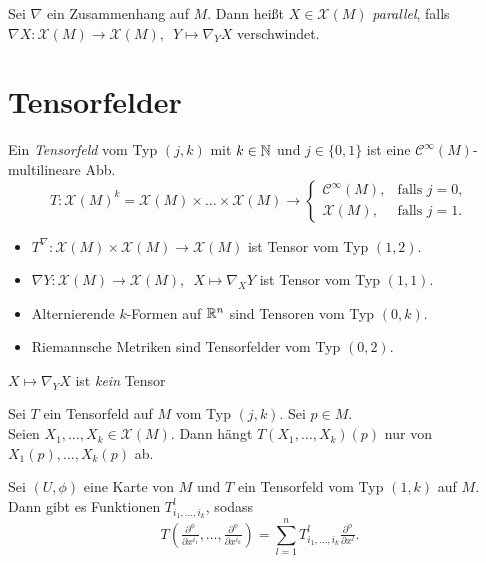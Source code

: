 \documentclass{cheat-sheet}
\newcommand{\coord}[1]{\tfrac{\partial^\phi}{\partial x^{#1}}} %
\newcommand{\Cont}{\mathcal{C}} %
\newcommand{\VF}{\mathcal{X}} %
\begin{document}
\begin{defn}
  Sei $\nabla$ ein Zusammenhang auf $M$. Dann heißt $X \in \VF(M)$ \emph{parallel}, falls
  $\nabla X : \VF(M) \to \VF(M), \enspace Y \mapsto \nabla_Y X$
  verschwindet.
\end{defn}

\section{Tensorfelder}

\begin{defn}
  Ein \emph{Tensorfeld} vom Typ $(j, k)$ mit $k \in \mathbb{N}$ und $j \in \{ 0, 1 \}$ ist eine $\Cont^\infty(M)$-multilineare Abb.
  \vspace{-0.6em}
  \[
    T : \VF(M)^k = \VF(M) \times \ldots \times \VF(M) \to
    \begin{cases}
      \Cont^\infty(M), & \text{falls } j = 0,\\
      \VF(M), & \text{falls } j = 1.
    \end{cases}
  \]
\end{defn}

\begin{bspe}
  \begin{itemize}
    \item $T^\nabla : \VF(M) \times \VF(M) \to \VF(M)$ ist Tensor vom Typ $(1, 2)$.
    \item $\nabla Y : \VF(M) \to \VF(M), \enspace X \mapsto \nabla_X Y$ ist Tensor vom Typ $(1, 1)$.
    \item Alternierende $k$-Formen auf $\mathbb{R}^n$ sind Tensoren vom Typ $(0, k)$.
    \item Riemannsche Metriken sind Tensorfelder vom Typ $(0, 2)$.
  \end{itemize}
\end{bspe}

\begin{gegenbsp}
  $X \mapsto \nabla_Y X$ ist \textit{kein} Tensor
\end{gegenbsp}

\begin{satz}
  Sei $T$ ein Tensorfeld auf $M$ vom Typ $(j, k)$.
  Sei $p \in M$. \\
  Seien $X_1, \ldots, X_k \in \VF(M)$. Dann hängt $T(X_1, \ldots, X_k)(p)$ nur von $X_1(p), \ldots, X_k(p)$ ab.
\end{satz}


\begin{bem}
  Sei $(U, \phi)$ eine Karte von $M$ und $T$ ein Tensorfeld vom Typ $(1, k)$ auf $M$. Dann gibt es Funktionen $T_{i_1, \ldots, i_k}^l$, sodass
  \[
    T(\coord{i_1}, \ldots, \coord{i_k}) = {\sum}_{l=1}^n T_{i_1, \ldots, i_k}^l \coord{l}.
  \]
\end{bem}
\end{document}
